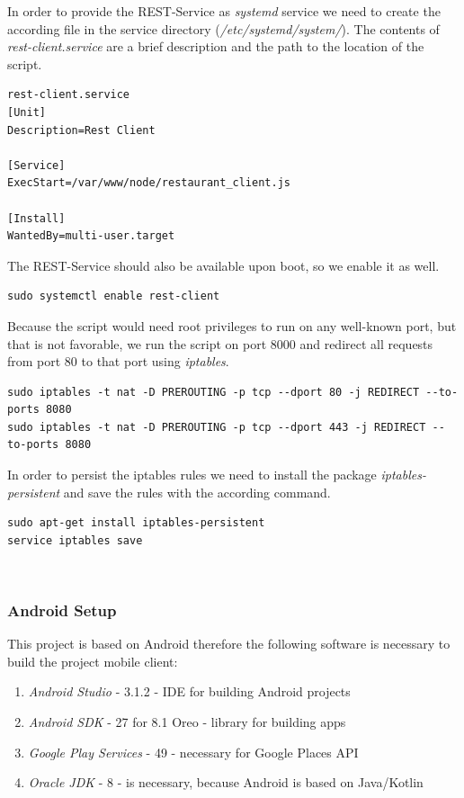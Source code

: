 In order to provide the REST-Service as \textit{systemd} service we need to create the according file in the service directory (\textit{/etc/systemd/system/}). The contents of \textit{rest-client.service} are a brief description and the path to the location of the script.
\begin{lstlisting}
rest-client.service
[Unit]
Description=Rest Client

[Service]
ExecStart=/var/www/node/restaurant_client.js

[Install]
WantedBy=multi-user.target
\end{lstlisting}

The REST-Service should also be available upon boot, so we enable it as well.
\begin{lstlisting}
sudo systemctl enable rest-client
\end{lstlisting}

Because the script would need root privileges to run on any well-known port, but that is not favorable, we run the script on port 8000 and redirect all requests from port 80 to that port using \textit{iptables}.
\begin{lstlisting}
sudo iptables -t nat -D PREROUTING -p tcp --dport 80 -j REDIRECT --to-ports 8080
sudo iptables -t nat -D PREROUTING -p tcp --dport 443 -j REDIRECT --to-ports 8080
\end{lstlisting}
In order to persist the iptables rules we need to install the package \textit{iptables-persistent} and save the rules with the according command.
\begin{lstlisting}
sudo apt-get install iptables-persistent
service iptables save
\end{lstlisting}

\


\subsubsection{Android Setup}
\label{sec:Android-Setup}
This project is based on Android therefore the following software is necessary to build the project mobile client:

\begin{enumerate}
	\item \textit{Android Studio} - 3.1.2 - IDE for building Android projects
	\item \textit{Android SDK} - 27 for 8.1 Oreo - library for building apps
	\item \textit{Google Play  Services} - 49 - necessary for Google Places API
	\item \textit{Oracle JDK} - 8 - is necessary, because Android is based on Java/Kotlin
\end{enumerate}

